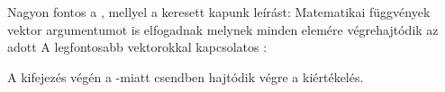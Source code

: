 Nagyon fontos a  \fv{}, mellyel a keresett  kapunk leírást:
Matematikai függvények  vektor argumentumot is elfogadnak melynek minden elemére
végrehajtódik az adott \fv{:}
\Dnew
A legfontosabb vektorokkal kapcsolatos :\newline
\centerline{}
A kifejezés végén a \mcode{;}-miatt csendben hajtódik végre a kiértékelés.